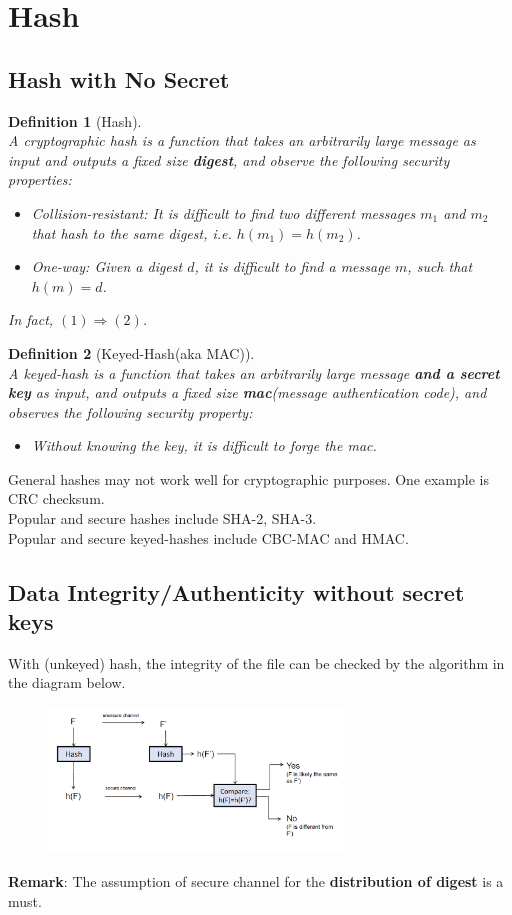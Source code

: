 \documentclass[12pt]{article}
\newtheorem{definition}{Definition}[section]
\theoremstyle{definition}
\begin{document}
\section{Hash}
\subsection{Hash with No Secret}
\begin{definition}[Hash]
\hfill\\\normalfont A cryptographic hash is a function that takes an arbitrarily large message as input and outputs a fixed size \textbf{digest}, and observe the following security properties:
\begin{itemize}
  \item Collision-resistant: It is difficult to find two different messages $m_1$ and $m_2$ that hash to the same digest, i.e. $h(m_1)= h(m_2)$.
  \item One-way: Given a digest $d$, it is difficult to find a message $m$, such that $h(m)=d$.
\end{itemize}
In fact, $(1)\Rightarrow (2)$.
\end{definition}
\begin{definition}[Keyed-Hash(aka MAC)]
\hfill\\\normalfont A keyed-hash is a function that takes an arbitrarily large message \textbf{and a secret key} as input, and outputs a fixed size \textbf{mac}(message authentication code), and observes the following security property:
\begin{itemize}
  \item Without knowing the key, it is difficult to forge the mac.
\end{itemize}
\end{definition}
General hashes may not work well for cryptographic purposes. One example is CRC checksum.\\
Popular and secure hashes include SHA-2, SHA-3.\\
Popular and secure keyed-hashes include CBC-MAC and HMAC.
\subsection{Data Integrity/Authenticity without secret keys}
With (unkeyed) hash, the integrity of the file can be checked by the algorithm in the diagram below.
\begin{figure}[h]
\centering
\includegraphics[width = 0.7\textwidth]{3_1.png}
\end{figure}
\textbf{Remark}: The assumption of secure channel for the \textbf{distribution of digest} is a must.
\end{document}
